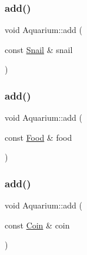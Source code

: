 \mbox{\label{class_aquarium_a9189f6891d0f9012515de3d7e4e765fe}} 
\subsubsection{\texorpdfstring{add()}{add()}\hspace{0.1cm}{\footnotesize\ttfamily [3/5]}}
{\footnotesize\ttfamily void Aquarium\+::add (\begin{DoxyParamCaption}\item[{const \mbox{\hyperlink{class_snail}{Snail}} \&}]{snail }\end{DoxyParamCaption})}

\mbox{\label{class_aquarium_a0eb7a1a387c68485088cbd7a161257cd}} 
\subsubsection{\texorpdfstring{add()}{add()}\hspace{0.1cm}{\footnotesize\ttfamily [4/5]}}
{\footnotesize\ttfamily void Aquarium\+::add (\begin{DoxyParamCaption}\item[{const \mbox{\hyperlink{class_food}{Food}} \&}]{food }\end{DoxyParamCaption})}

\mbox{\label{class_aquarium_ade3137910efb46f7d47a86a1cff0716b}} 
\subsubsection{\texorpdfstring{add()}{add()}\hspace{0.1cm}{\footnotesize\ttfamily [5/5]}}
{\footnotesize\ttfamily void Aquarium\+::add (\begin{DoxyParamCaption}\item[{const \mbox{\hyperlink{class_coin}{Coin}} \&}]{coin }\end{DoxyParamCaption})}

\mbox{\label{class_aquarium_a2524ad6a6a267f58251a9edc514fab53}} 
